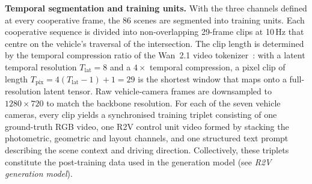 \textbf{Temporal segmentation and training units.}
With the three channels defined at every cooperative frame,
the 86 scenes are segmented into training units. Each
cooperative sequence is divided into non-overlapping 29-frame
clips at 10\,Hz that centre on the vehicle's traversal of the
intersection. The clip length is determined by the temporal
compression ratio of the Wan~2.1 video
tokenizer~\cite{wan2pt1}: with a latent temporal resolution
$T_{\mathrm{lat}}\!=\!8$ and a $4\!\times$ temporal
compression, a pixel clip of length
$T_{\mathrm{pix}}=4(T_{\mathrm{lat}}-1)+1=29$ is the shortest
window that maps onto a full-resolution latent tensor. Raw
vehicle-camera frames are downsampled to $1280\!\times\!720$
to match the backbone resolution. For each of the seven
vehicle cameras, every clip yields a synchronised training
triplet consisting of one ground-truth RGB video, one R2V
control unit video formed by stacking the photometric,
geometric and layout channels, and one structured text prompt
describing the scene context and driving direction.
Collectively, these triplets constitute the post-training
data used in the generation model (see \emph{R2V generation
model}).
